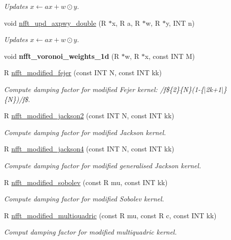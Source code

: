 \begin{DoxyCompactItemize}
\begin{DoxyCompactList}\small\item\em Updates $x \leftarrow a x + w\odot y$. \end{DoxyCompactList}\item 
void \hyperlink{group__nfftutil_gaa9e49e004f4feac29f0524a1fd91c8a2}{nfft\-\_\-upd\-\_\-axpwy\-\_\-double} (R $\ast$x, R a, R $\ast$w, R $\ast$y, I\-N\-T n)
\begin{DoxyCompactList}\small\item\em Updates $x \leftarrow a x + w\odot y$. \end{DoxyCompactList}\item 
\hypertarget{group__nfftutil_ga3737d0c792171aaae2e35f68fb8324a7}{void {\bfseries nfft\-\_\-voronoi\-\_\-weights\-\_\-1d} (R $\ast$w, R $\ast$x, const I\-N\-T M)}\label{group__nfftutil_ga3737d0c792171aaae2e35f68fb8324a7}

\item 
\hypertarget{group__nfftutil_ga96a06587202a96f85ddc3c9c157bd527}{R \hyperlink{group__nfftutil_ga96a06587202a96f85ddc3c9c157bd527}{nfft\-\_\-modified\-\_\-fejer} (const I\-N\-T N, const I\-N\-T kk)}\label{group__nfftutil_ga96a06587202a96f85ddc3c9c157bd527}

\begin{DoxyCompactList}\small\item\em Compute damping factor for modified Fejer kernel\-: /f\$\{2\}\{N\}(1-\/\{$\vert$2k+1$\vert$\}\{N\})/f\$. \end{DoxyCompactList}\item 
R \hyperlink{group__nfftutil_gaf451ea819919e655c8c969f1bb77e48a}{nfft\-\_\-modified\-\_\-jackson2} (const I\-N\-T N, const I\-N\-T kk)
\begin{DoxyCompactList}\small\item\em Compute damping factor for modified Jackson kernel. \end{DoxyCompactList}\item 
R \hyperlink{group__nfftutil_ga3665807727074424012cd35eed12ab97}{nfft\-\_\-modified\-\_\-jackson4} (const I\-N\-T N, const I\-N\-T kk)
\begin{DoxyCompactList}\small\item\em Compute damping factor for modified generalised Jackson kernel. \end{DoxyCompactList}\item 
R \hyperlink{group__nfftutil_ga6ff9fccb583a5892a56d8cad99282ce9}{nfft\-\_\-modified\-\_\-sobolev} (const R mu, const I\-N\-T kk)
\begin{DoxyCompactList}\small\item\em Compute damping factor for modified Sobolev kernel. \end{DoxyCompactList}\item 
R \hyperlink{group__nfftutil_gaa9f833b1478690f3cbaa8aac906aa7f7}{nfft\-\_\-modified\-\_\-multiquadric} (const R mu, const R c, const I\-N\-T kk)
\begin{DoxyCompactList}\small\item\em Comput damping factor for modified multiquadric kernel. \end{DoxyCompactList}\end{DoxyCompactItemize}


